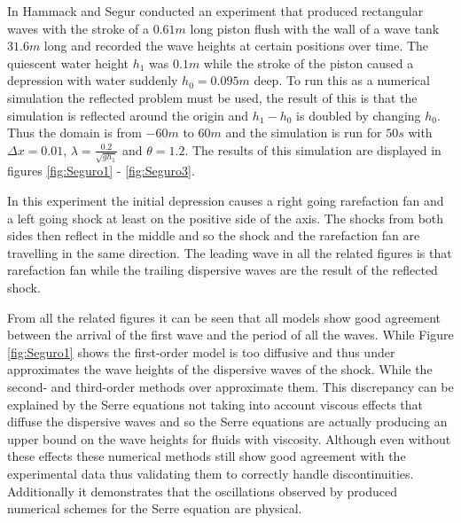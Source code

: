 \documentclass[SingleSpace,12pt]{Serre_ASCE}
\begin{document}
In \cite{Hammack-Segur-1978-337} Hammack and Segur conducted an experiment that produced rectangular waves with the stroke of a $0.61m$ long piston flush with the wall of a wave tank $31.6m$ long and recorded the wave heights at certain positions over time. The quiescent water height $h_1$ was $0.1m$ while the stroke of the piston caused a depression with water suddenly $h_0 = 0.095m$ deep. To run this as a numerical simulation the reflected problem must be used, the result of this is that the simulation is reflected around the origin and $h_1 - h_0$ is doubled by changing $h_0$. Thus the domain is from $-60m$ to $60m$ and the simulation is run for $50s$ with $\Delta x = 0.01$, $\lambda = \frac{0.2}{\sqrt{g h_1}}$ and $\theta = 1.2$. The results of this simulation are displayed in figures \ref{fig:Seguro1} - \ref{fig:Seguro3}.

In this experiment the initial depression causes a right going rarefaction fan and a left going shock at least on the positive side of the axis. The shocks from both sides then reflect in the middle and so the shock and the rarefaction fan are travelling in the same direction. The leading wave in all the related figures is that rarefaction fan while the trailing dispersive waves are the result of the reflected shock.  

From all the related figures it can be seen that all models show good agreement between the arrival of the first wave and the period of all the waves. While Figure \ref{fig:Seguro1} shows the first-order model is too diffusive and thus under approximates the wave heights of the dispersive waves of the shock. While the second- and third-order methods over approximate them. This discrepancy can be explained by the Serre equations not taking into account viscous effects that diffuse the dispersive waves and so the Serre equations are actually producing an upper bound on the wave heights for fluids with viscosity. Although even without these effects these numerical methods still show good agreement with the experimental data thus validating them to correctly handle discontinuities. Additionally it demonstrates that the oscillations observed by produced numerical schemes for the Serre equation are physical.  
\end{document}
